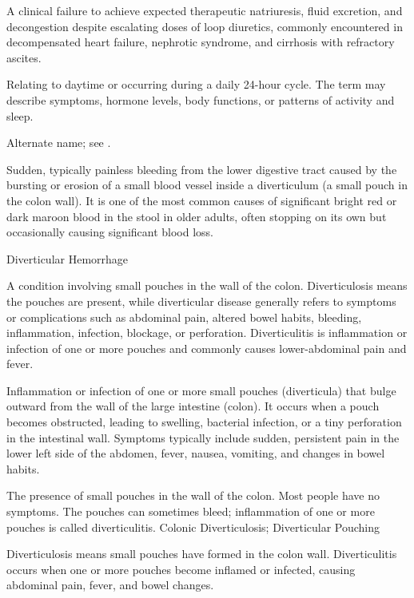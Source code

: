  A clinical failure to achieve expected therapeutic natriuresis, fluid excretion, and decongestion despite escalating doses of loop diuretics, commonly encountered in decompensated heart failure, nephrotic syndrome, and cirrhosis with refractory ascites.

 Relating to daytime or occurring during a daily 24-hour cycle. The term may describe symptoms, hormone levels, body functions, or patterns of activity and sleep.

 Alternate name; see .

 Sudden, typically painless bleeding from the lower digestive tract caused by the bursting or erosion of a small blood vessel inside a diverticulum (a small pouch in the colon wall). It is one of the most common causes of significant bright red or dark maroon blood in the stool in older adults, often stopping on its own but occasionally causing significant blood loss.

\synonyms
Diverticular Hemorrhage

 A condition involving small pouches in the wall of the colon. Diverticulosis means the pouches are present, while diverticular disease generally refers to symptoms or complications such as abdominal pain, altered bowel habits, bleeding, inflammation, infection, blockage, or perforation. Diverticulitis is inflammation or infection of one or more pouches and commonly causes lower-abdominal pain and fever.

 Inflammation or infection of one or more small pouches (diverticula) that bulge outward from the wall of the large intestine (colon). It occurs when a pouch becomes obstructed, leading to swelling, bacterial infection, or a tiny perforation in the intestinal wall. Symptoms typically include sudden, persistent pain in the lower left side of the abdomen, fever, nausea, vomiting, and changes in bowel habits.

 The presence of small pouches in the wall of the colon. Most people have no symptoms. The pouches can sometimes bleed; inflammation of one or more pouches is called diverticulitis.
\synonyms
Colonic Diverticulosis; Diverticular Pouching


 Diverticulosis means small pouches have formed in the colon wall. Diverticulitis occurs when one or more pouches become inflamed or infected, causing abdominal pain, fever, and bowel changes.

